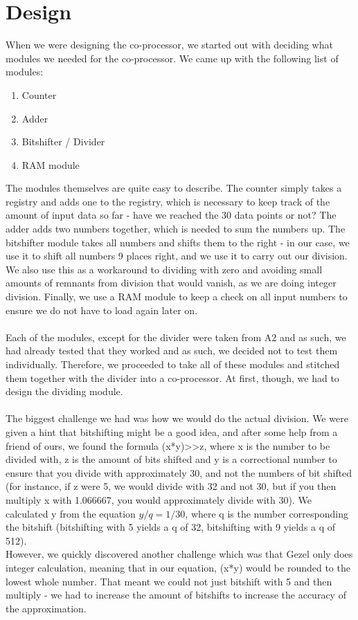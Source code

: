 \documentclass[12pt,a4paper]{article}
\begin{document}
\section{Design}
	When we were designing the co-processor, we started out with deciding what modules we needed for the co-processor. We came up with the following list of modules:\\
	\begin{enumerate}
		\item Counter
		\item Adder
		\item Bitshifter / Divider
		\item RAM module
	\end{enumerate}
	The modules themselves are quite easy to describe. The counter simply takes a registry and adds one to the registry, which is necessary to keep track of the amount of input data so far - have we reached the 30 data points or not? The adder adds two numbers together, which is needed to sum the numbers up. The bitshifter module takes all numbers and shifts them to the right - in our case, we use it to shift all numbers 9 places right, and we use it to carry out our division. We also use this as a workaround to dividing with zero and avoiding small amounts of remnants from division that would vanish, as we are doing integer division. Finally, we use a RAM module to keep a check on all input numbers to ensure we do not have to load again later on.\\
	\\
	Each of the modules, except for the divider were taken from A2 and as such, we had already tested that they worked and as such, we decided not to test them individually. Therefore, we proceeded to take all of these modules and stitched them together with the divider into a co-processor. At first, though, we had to design the dividing module.\\
	\\
	The biggest challenge we had was how we would do the actual division. We were given a hint that bitshifting might be a good idea, and after some help from a friend of ours, we found the formula (x*y)>>z, where x is the number to be divided with, z is the amount of bits shifted and y is a correctional number to ensure that you divide with approximately 30, and not the numbers of bit shifted (for instance, if z were 5, we would divide with 32 and not 30, but if you then multiply x with 1.066667, you would approximately divide with 30). We calculated y from the equation $y/q=1/30$, where q is the number corresponding the bitshift (bitshifting with 5 yields a q of 32, bitshifting with 9 yields a q of 512).\\ However, we quickly discovered another challenge which was that Gezel only does integer calculation, meaning that in our equation, (x*y) would be rounded to the lowest whole number. That meant we could not just bitshift with 5 and then multiply - we had to increase the amount of bitshifts to increase the accuracy of the approximation.\\
\end{document}
